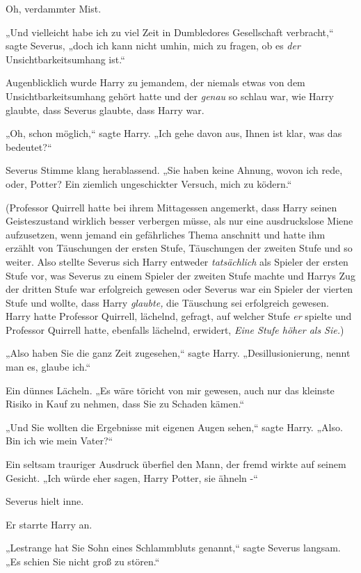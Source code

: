 {Oh, verdammter Mist.

„Und vielleicht habe ich zu viel Zeit in Dumbledores Gesellschaft verbracht,“ sagte Severus, „doch ich kann nicht umhin, mich zu fragen, ob es \emph{der} Unsichtbarkeitsumhang ist.“

Augenblicklich wurde Harry zu jemandem, der niemals etwas von dem Unsichtbarkeitsumhang gehört hatte und der \emph{genau} so schlau war, wie Harry glaubte, dass Severus glaubte, dass Harry war.

„Oh, schon möglich,“ sagte Harry. „Ich gehe davon aus, Ihnen ist klar, was das bedeutet?“

Severus Stimme klang herablassend. „Sie haben keine Ahnung, wovon ich rede, oder, Potter? Ein ziemlich ungeschickter Versuch, mich zu ködern.“

(Professor Quirrell hatte bei ihrem Mittagessen angemerkt, dass Harry seinen Geisteszustand wirklich besser verbergen müsse, als nur eine ausdruckslose Miene aufzusetzen, wenn jemand ein gefährliches Thema anschnitt und hatte ihm erzählt von Täuschungen der ersten Stufe, Täuschungen der zweiten Stufe und so weiter. Also stellte Severus sich Harry entweder \emph{tatsächlich} als Spieler der ersten Stufe vor, was Severus zu einem Spieler der zweiten Stufe machte und Harrys Zug der dritten Stufe war erfolgreich gewesen oder Severus war ein Spieler der vierten Stufe und wollte, dass Harry \emph{glaubte,} die Täuschung sei erfolgreich gewesen. Harry hatte Professor Quirrell, lächelnd, gefragt, auf welcher Stufe \emph{er} spielte und Professor Quirrell hatte, ebenfalls lächelnd, erwidert, \emph{Eine Stufe höher als Sie.})

„Also haben Sie die ganz Zeit zugesehen,“ sagte Harry. „Desillusionierung, nennt man es, glaube ich.“

Ein dünnes Lächeln. „Es wäre töricht von mir gewesen, auch nur das kleinste Risiko in Kauf zu nehmen, dass Sie zu Schaden kämen.“

„Und Sie wollten die Ergebnisse mit eigenen Augen sehen,“ sagte Harry. „Also. Bin ich wie mein Vater?“

Ein seltsam trauriger Ausdruck überfiel den Mann, der fremd wirkte auf seinem Gesicht. „Ich würde eher sagen, Harry Potter, sie ähneln -“

Severus hielt inne.

Er starrte Harry an.

„Lestrange hat Sie Sohn eines Schlammbluts genannt,“ sagte Severus langsam. „Es schien Sie nicht groß zu stören.“

}
